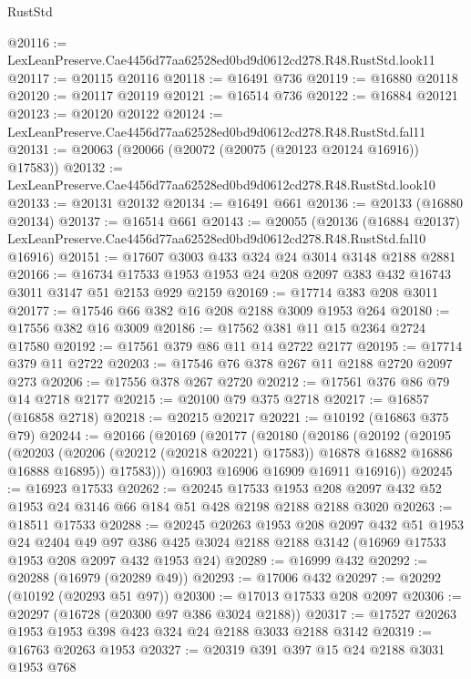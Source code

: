\begin{lexlean}{RustStd}
\begin{coremodule}
@20116 := LexLeanPreserve.Cae4456d77aa62528ed0bd9d0612cd278.R48.RustStd.look11
@20117 := @20115 @20116
@20118 := @16491 @736
@20119 := @16880 @20118
@20120 := @20117 @20119
@20121 := @16514 @736
@20122 := @16884 @20121
@20123 := @20120 @20122
@20124 := LexLeanPreserve.Cae4456d77aa62528ed0bd9d0612cd278.R48.RustStd.fal11
@20131 := @20063 (@20066 (@20072 (@20075 (@20123 @20124 @16916)) @17583))
@20132 := LexLeanPreserve.Cae4456d77aa62528ed0bd9d0612cd278.R48.RustStd.look10
@20133 := @20131 @20132
@20134 := @16491 @661
@20136 := @20133 (@16880 @20134)
@20137 := @16514 @661
@20143 := @20055
    (@20136
      (@16884 @20137)
      LexLeanPreserve.Cae4456d77aa62528ed0bd9d0612cd278.R48.RustStd.fal10
      @16916)
@20151 := @17607 @3003 @433 @324 @24 @3014 @3148 @2188 @2881
@20166 := @16734 @17533 @1953 @1953 @24 @208 @2097 @383 @432 @16743 @3011 @3147 @51 @2153 @929 @2159
@20169 := @17714 @383 @208 @3011
@20177 := @17546 @66 @382 @16 @208 @2188 @3009 @1953 @264
@20180 := @17556 @382 @16 @3009
@20186 := @17562 @381 @11 @15 @2364 @2724 @17580
@20192 := @17561 @379 @86 @11 @14 @2722 @2177
@20195 := @17714 @379 @11 @2722
@20203 := @17546 @76 @378 @267 @11 @2188 @2720 @2097 @273
@20206 := @17556 @378 @267 @2720
@20212 := @17561 @376 @86 @79 @14 @2718 @2177
@20215 := @20100 @79 @375 @2718
@20217 := @16857 (@16858 @2718)
@20218 := @20215 @20217
@20221 := @10192 (@16863 @375 @79)
@20244 := @20166
    (@20169
      (@20177
        (@20180
          (@20186
            (@20192
              (@20195
                (@20203
                  (@20206 (@20212 (@20218 @20221) @17583))
                  @16878
                  @16882
                  @16886
                  @16888
                  @16895))
              @17583)))
        @16903
        @16906
        @16909
        @16911
        @16916))
@20245 := @16923 @17533
@20262 := @20245
    @17533
    @1953
    @208
    @2097
    @432
    @52
    @1953
    @24
    @3146
    @66
    @184
    @51
    @428
    @2198
    @2188
    @2188
    @3020
@20263 := @18511 @17533
@20288 := @20245
    @20263
    @1953
    @208
    @2097
    @432
    @51
    @1953
    @24
    @2404
    @49
    @97
    @386
    @425
    @3024
    @2188
    @2188
    @3142
    (@16969 @17533 @1953 @208 @2097 @432 @1953 @24)
@20289 := @16999 @432
@20292 := @20288 (@16979 (@20289 @49))
@20293 := @17006 @432
@20297 := @20292 (@10192 (@20293 @51 @97))
@20300 := @17013 @17533 @208 @2097
@20306 := @20297 (@16728 (@20300 @97 @386 @3024 @2188))
@20317 := @17527 @20263 @1953 @1953 @398 @423 @324 @24 @2188 @3033 @2188 @3142
@20319 := @16763 @20263 @1953
@20327 := @20319 @391 @397 @15 @24 @2188 @3031 @1953 @768

\end{coremodule}
\end{lexlean}
